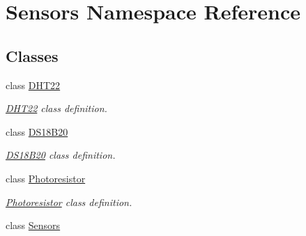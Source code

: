 \hypertarget{namespaceSensors}{}\section{Sensors Namespace Reference}
\label{namespaceSensors}
\subsection*{Classes}
\begin{DoxyCompactItemize}
\item 
class \hyperlink{classSensors_1_1DHT22}{D\+H\+T22}
\begin{DoxyCompactList}\small\item\em \hyperlink{classSensors_1_1DHT22}{D\+H\+T22} class definition. \end{DoxyCompactList}\item 
class \hyperlink{classSensors_1_1DS18B20}{D\+S18\+B20}
\begin{DoxyCompactList}\small\item\em \hyperlink{classSensors_1_1DS18B20}{D\+S18\+B20} class definition. \end{DoxyCompactList}\item 
class \hyperlink{classSensors_1_1Photoresistor}{Photoresistor}
\begin{DoxyCompactList}\small\item\em \hyperlink{classSensors_1_1Photoresistor}{Photoresistor} class definition. \end{DoxyCompactList}\item 
class \hyperlink{classSensors_1_1Sensors}{Sensors}
\end{DoxyCompactItemize}
